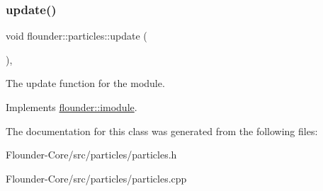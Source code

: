 \subsubsection{\texorpdfstring{update()}{update()}}
{\footnotesize\ttfamily void flounder\+::particles\+::update (\begin{DoxyParamCaption}{ }\end{DoxyParamCaption})\hspace{0.3cm}{\ttfamily [override]}, {\ttfamily [virtual]}}



The update function for the module. 



Implements \hyperlink{classflounder_1_1imodule_a9a53d48a46b5f6b16a92b2cd8503f74a}{flounder\+::imodule}.



The documentation for this class was generated from the following files\+:\begin{DoxyCompactItemize}
\item 
Flounder-\/\+Core/src/particles/particles.\+h\item 
Flounder-\/\+Core/src/particles/particles.\+cpp\end{DoxyCompactItemize}
